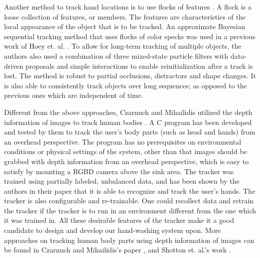 Another method to track hand locations is to use flocks of features \cite{hoey2006tracking}. A flock is a loose collection of features, or members. The features are characteristics of the local appearance of the object that is to be tracked. An approximate Bayesian sequential tracking method that uses flocks of color specks was used in a previous work of Hoey et. al. \cite{hoey2006tracking}. To allow for long-term tracking of multiple objects, the authors also used a combination of three mixed-state particle filters \cite{isard1998mixed} with data-driven proposals \cite{okuma2004boosted} and simple interactions to enable reinitialization after a track is lost. The method is robust to partial occlusions, distractors and shape changes. It is also able to consistently track objects over long sequences; as opposed to the previous ones which are independent of time.

Different from the above approaches, Czarnuch and Mihailidis utilized the depth information of images to track human bodies \cite{czarnuch2014}. A C program has been developed and tested by them to track the user's body parts (such as head and hands) from an overhead perspective. The program has no prerequisites on environmental conditions or physical settings of the system, other than that images should be grabbed with depth information from an overhead perspective, which is easy to satisfy by mounting a RGBD camera above the sink area. The tracker was trained using partially labeled, unbalanced data, and has been shown by the authors in their paper that it is able to recognize and track the user's hands. The tracker is also configurable and re-trainable. One could recollect data and retrain the tracker if the tracker is to run in an environment different from the one which it was trained in. All these desirable features of the tracker make it a good candidate to design and develop our hand-washing system upon. More approaches on tracking human body parts using depth information of images can be found in Czarnuch and Mihailidis's paper \cite{czarnuch2014}, and Shotton et. al.'s work \cite{shotton2013real}.
